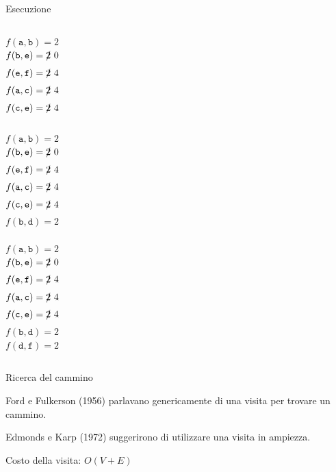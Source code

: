 \begin{frame}{Esecuzione}
\begin{columns}[T]
\begin{overprint}
$f(\mathtt{a},\mathtt{b}) = 2$\\
$f(\mathtt{b},\mathtt{e}) = \xout{2} \ 0$\\
$f(\mathtt{e},\mathtt{f}) = \xout{2} \ 4$\\
$f(\mathtt{a},\mathtt{c}) = \xout{2} \ 4$\\
$f(\mathtt{c},\mathtt{e}) = \xout{2} \ 4$\\
\\
$f(\mathtt{a},\mathtt{b}) = 2$\\
$f(\mathtt{b},\mathtt{e}) = \xout{2} \ 0$\\
$f(\mathtt{e},\mathtt{f}) = \xout{2} \ 4$\\
$f(\mathtt{a},\mathtt{c}) = \xout{2} \ 4$\\
$f(\mathtt{c},\mathtt{e}) = \xout{2} \ 4$\\
$f(\mathtt{b},\mathtt{d}) = 2$\\
\\
$f(\mathtt{a},\mathtt{b}) = 2$\\
$f(\mathtt{b},\mathtt{e}) = \xout{2} \ 0$\\
$f(\mathtt{e},\mathtt{f}) = \xout{2} \ 4$\\
$f(\mathtt{a},\mathtt{c}) = \xout{2} \ 4$\\
$f(\mathtt{c},\mathtt{e}) = \xout{2} \ 4$\\
$f(\mathtt{b},\mathtt{d}) = 2$\\
$f(\mathtt{d},\mathtt{f}) = 2$\\
\end{overprint}

\end{columns}

\end{frame}


\begin{frame}{Ricerca del cammino}

Ford e Fulkerson (1956) parlavano genericamente di una visita per trovare un cammino.

\bigskip
Edmonds e Karp (1972) suggerirono di utilizzare una visita in ampiezza.

\bigskip
Costo della visita: $O(V+E)$


\end{frame}

